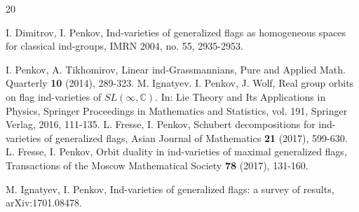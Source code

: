 \documentclass[11pt]{amsart}
\numberwithin{equation}{section}
\theoremstyle{plain}
\theoremstyle{remark}
\theoremstyle{remark}
\theoremstyle{construction}
\begin{document}
\begin{thebibliography}{20}

 I. Dimitrov, I. Penkov,  {Ind-varieties of generalized flags as homogeneous spaces for classical ind-groups}, IMRN 2004, no. 55, 2935-2953.

 I. Penkov, A. Tikhomirov, {Linear ind-Grassmannians}, Pure and Applied Math. Quarterly {\bf 10} (2014), 289-323.
 M. Ignatyev. I. Penkov, J. Wolf, {Real group orbits on flag ind-varieties of $SL(\infty,\mathbb C)$}. In: Lie Theory and Its Applications in Physics, Springer Proceedings in Mathematics and Statistics, vol. 191, Springer Verlag, 2016, 111-135.	
 L. Fresse, I. Penkov, {Schubert decompositions for ind-varieties of generalized flags}, Asian Journal of Mathematics {\bf 21} (2017), 599-630.
 L. Fresse, I. Penkov, {Orbit duality in ind-varieties of maximal generalized flags}, Transactions of the Moscow Mathematical Society {\bf 78} (2017), 131-160.

 M. Ignatyev, I. Penkov, {Ind-varieties of generalized flags: a survey of results, } arXiv:1701.08478.







\end{thebibliography}
\end{document}
